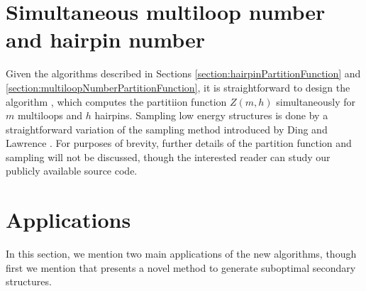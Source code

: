 \section{Simultaneous multiloop number and hairpin number}
\label{section:RNAhairpinml}

Given the algorithms described in Sections
\ref{section:hairpinPartitionFunction} and
\ref{section:multiloopNumberPartitionFunction}, it is straightforward
to design the algorithm {\rnahairpinml}, which computes the partitiion
function $Z(m,h)$ simultaneously for $m$ multiloops and $h$ hairpins.
Sampling low energy structures is done by a straightforward variation of
the sampling method introduced by Ding and Lawrence \cite{Ding.nar03}.
For purposes of brevity, further details of the partition function and
sampling will not be discussed, though the interested reader can study
our publicly available source code.

\section{Applications}
\label{section:applications}

In this section, we mention two main applications of the new algorithms,
though first we mention that {\rnahairpin} presents a novel method to
generate suboptimal secondary structures.


